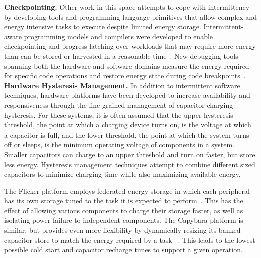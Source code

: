 \vspace{-6pt}
\noindent
\textbf{Checkpointing.}
Other work in this space attempts to cope with
intermittency
by developing tools and
programming language primitives that allow %
complex and energy intensive tasks to execute despite limited energy storage.
Intermittent-aware programming
models and compilers were developed to enable checkpointing and progress latching over
workloads that may require more energy than can be stored or harvested in a
reasonable time~\cite{lucia2015simpler, ransford2012mementos, hesterTimely17}. New debugging tools
spanning both the hardware and software domains
measure the energy required for specific code operations
and restore energy state during code breakpoints~\cite{colin2016energy}.
\\

\vspace{-6pt}
\noindent
\textbf{Hardware Hysteresis Management.}
In addition to intermittent software techniques,
hardware platforms have been developed to
increase availability and responsiveness through the fine-grained management
of capacitor charging hysteresis.
For these systems,
it is often assumed that the upper hysteresis threshold, the point at which a
charging device turns on, is the voltage at which a capacitor is full, and the
lower threshold, the point at which the system turns off or sleeps, is the minimum
operating voltage of components in a system.
Smaller capacitors can charge to an upper
threshold and turn on faster, but store less energy.  Hysteresis management
techniques attempt to combine different sized capacitors to
minimize charging time while also maximizing available energy.

The Flicker
platform employs federated
energy storage in which each peripheral has its own storage tuned to the task
it is expected to perform~\cite{hesterTragedy15,hesterFlicker17}. This has the
effect of allowing various components to charge their storage faster, as well
as isolating power failure to independent components.  The Capybara platform is
similar, but provides even more flexibility by dynamically resizing its banked
capacitor store to match the energy required by a task
~\cite{colinReconfigurable18}. This leads to the lowest possible cold start and
capacitor recharge times to support a given
operation.

